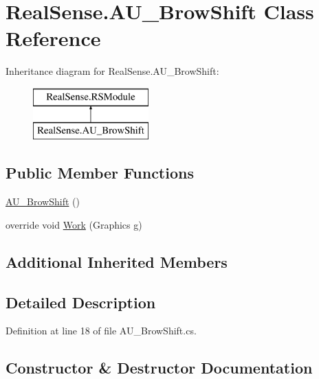 \hypertarget{class_real_sense_1_1_a_u___brow_shift}{}\section{Real\+Sense.\+A\+U\+\_\+\+Brow\+Shift Class Reference}
\label{class_real_sense_1_1_a_u___brow_shift}
Inheritance diagram for Real\+Sense.\+A\+U\+\_\+\+Brow\+Shift\+:\begin{figure}[H]
\begin{center}
\leavevmode
\includegraphics[height=2.000000cm]{class_real_sense_1_1_a_u___brow_shift}
\end{center}
\end{figure}
\subsection*{Public Member Functions}
\begin{DoxyCompactItemize}
\item 
\hyperlink{class_real_sense_1_1_a_u___brow_shift_a65b13018204e75f590f8422b0436e944}{A\+U\+\_\+\+Brow\+Shift} ()
\item 
override void \hyperlink{class_real_sense_1_1_a_u___brow_shift_a81ed7b844c217d3092412e0f53378dd5}{Work} (Graphics g)
\end{DoxyCompactItemize}
\subsection*{Additional Inherited Members}


\subsection{Detailed Description}


Definition at line 18 of file A\+U\+\_\+\+Brow\+Shift.\+cs.



\subsection{Constructor \& Destructor Documentation}
\mbox{\label{class_real_sense_1_1_a_u___brow_shift_a65b13018204e75f590f8422b0436e944}} 
